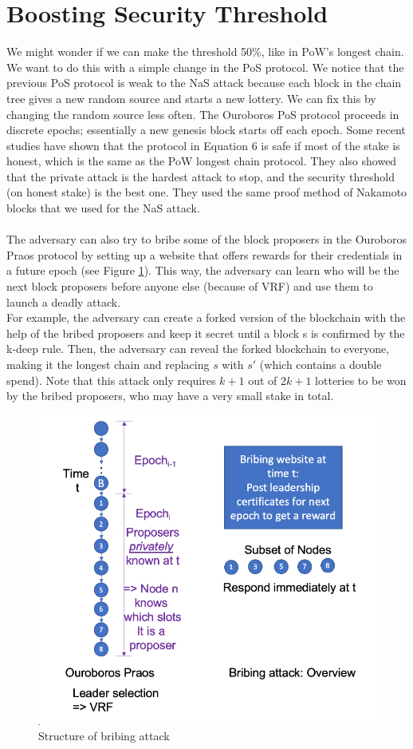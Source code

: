 \section{Boosting Security Threshold}
We might wonder if we can make the threshold 50\%, like in PoW's longest chain. We want to do this with a simple change in the PoS protocol. We notice that the previous PoS protocol is weak to the NaS attack because each block in the chain tree gives a new random source and starts a new lottery. We can fix this by changing the random source less often.
The Ouroboros PoS protocol proceeds in discrete epochs; essentially a new genesis block starts off each epoch.
Some recent studies have shown that the protocol in Equation 6 is safe if most of the stake is honest, which is the same as the PoW longest chain protocol. They also showed that the private attack is the hardest attack to stop, and the security threshold (on honest stake) is the best one. They used the same proof method of Nakamoto blocks that we used for the NaS attack.\\\\
The adversary can also try to bribe some of the block proposers in the Ouroboros Praos protocol by setting up a website that offers rewards for their credentials in a future epoch (see Figure \ref{fig:f3}). This way, the adversary can learn who will be the next block proposers before anyone else (because of VRF) and use them to launch a deadly attack. \\
For example, the adversary can create a forked version of the blockchain with the help of the bribed proposers and keep it secret until a block s is confirmed by the k-deep rule. Then, the adversary can reveal the forked blockchain to everyone, making it the longest chain and replacing $s$ with $s′$ (which contains a double spend). Note that this attack only requires $k + 1$ out of $2k + 1$ lotteries to be won by the bribed proposers, who may have a very small stake in total.
\begin{figure}[h!]
    \centering
    \includegraphics[width=0.55\linewidth]{Fig/11/F3}
    \caption{Structure of bribing attack}
    \label{fig:f3}
\end{figure}
